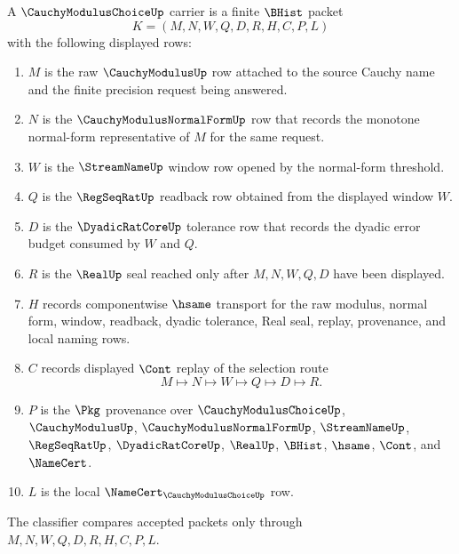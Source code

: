 \begin{definition}
\label{def:cauchy-modulus-choice-carrier}
A $\CauchyModulusChoiceUp$ carrier is a finite $\BHist$ packet
$$
K=(M,N,W,Q,D,R,H,C,P,L)
$$
with the following displayed rows:
\begin{enumerate}
\item $M$ is the raw $\CauchyModulusUp$ row attached to the source Cauchy name and the finite precision request being answered.
\item $N$ is the $\CauchyModulusNormalFormUp$ row that records the monotone normal-form representative of $M$ for the same request.
\item $W$ is the $\StreamNameUp$ window row opened by the normal-form threshold.
\item $Q$ is the $\RegSeqRatUp$ readback row obtained from the displayed window $W$.
\item $D$ is the $\DyadicRatCoreUp$ tolerance row that records the dyadic error budget consumed by $W$ and $Q$.
\item $R$ is the $\RealUp$ seal reached only after $M,N,W,Q,D$ have been displayed.
\item $H$ records componentwise $\hsame$ transport for the raw modulus, normal form, window, readback, dyadic tolerance, Real seal, replay, provenance, and local naming rows.
\item $C$ records displayed $\Cont$ replay of the selection route
$$
M\longmapsto N\longmapsto W\longmapsto Q\longmapsto D\longmapsto R .
$$
\item $P$ is the $\Pkg$ provenance over $\CauchyModulusChoiceUp$, $\CauchyModulusUp$, $\CauchyModulusNormalFormUp$, $\StreamNameUp$, $\RegSeqRatUp$, $\DyadicRatCoreUp$, $\RealUp$, $\BHist$, $\hsame$, $\Cont$, and $\NameCert$.
\item $L$ is the local $\NameCert_{\CauchyModulusChoiceUp}$ row.
\end{enumerate}
The classifier compares accepted packets only through $M,N,W,Q,D,R,H,C,P,L$.
\end{definition}


